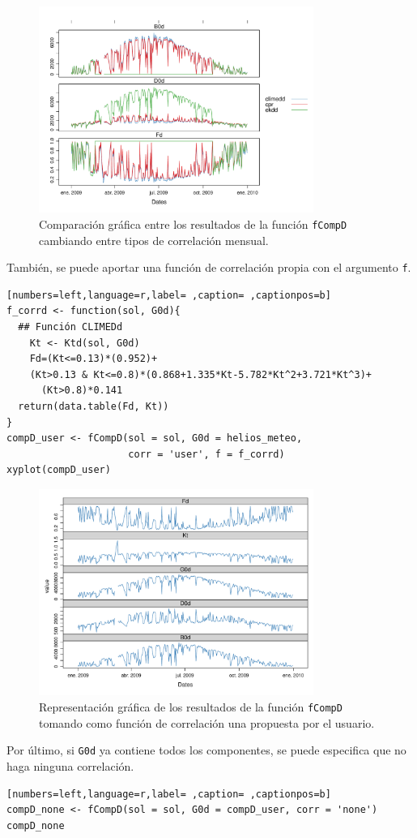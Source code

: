 \begin{itemize}
\begin{itemize}
\begin{figure}[!htb]
\centering
\includegraphics[width=0.8\textwidth]{figuras/codigo-fcompddia.pdf}
\caption{Comparación gráfica entre los resultados de la función \texttt{fCompD} cambiando entre tipos de correlación mensual.}
\end{figure}
También, se puede aportar una función de correlación propia con el argumento \texttt{f}.
\begin{lstlisting}[numbers=left,language=r,label= ,caption= ,captionpos=b]
f_corrd <- function(sol, G0d){
  ## Función CLIMEDd
    Kt <- Ktd(sol, G0d)
    Fd=(Kt<=0.13)*(0.952)+
    (Kt>0.13 & Kt<=0.8)*(0.868+1.335*Kt-5.782*Kt^2+3.721*Kt^3)+
      (Kt>0.8)*0.141
  return(data.table(Fd, Kt))
}
compD_user <- fCompD(sol = sol, G0d = helios_meteo,
                     corr = 'user', f = f_corrd)
xyplot(compD_user)
\end{lstlisting}

\begin{figure}[!htb]
\centering
\includegraphics[width=0.8\textwidth]{figuras/codigo-fcompduser.pdf}
\caption{Representación gráfica de los resultados de la función \texttt{fCompD} tomando como función de correlación una propuesta por el usuario.}
\end{figure}
\FloatBarrier
Por último, si \texttt{G0d} ya contiene todos los componentes, se puede especifica que no haga ninguna correlación.
\begin{lstlisting}[numbers=left,language=r,label= ,caption= ,captionpos=b]
compD_none <- fCompD(sol = sol, G0d = compD_user, corr = 'none')
compD_none
\end{lstlisting}


\end{itemize}
\end{itemize}
